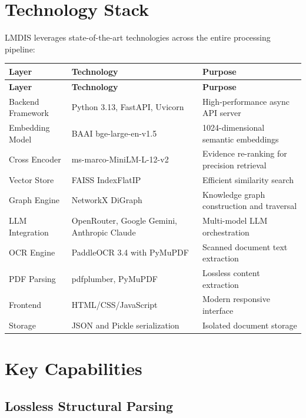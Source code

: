 \documentclass[11pt,a4paper]{article}
\begin{document}
\clearpage
\section{Technology Stack}

LMDIS leverages state-of-the-art technologies across the entire processing pipeline:

\begin{longtable}{@{}lp{5cm}p{5cm}@{}}
\toprule
\textbf{Layer} & \textbf{Technology} & \textbf{Purpose} \\
\midrule
\endfirsthead

\toprule
\textbf{Layer} & \textbf{Technology} & \textbf{Purpose} \\
\midrule
\endhead

\bottomrule
\endfoot

Backend Framework & Python 3.13, FastAPI, Uvicorn & High-performance async API server \\
Embedding Model & BAAI bge-large-en-v1.5 & 1024-dimensional semantic embeddings \\
Cross Encoder & ms-marco-MiniLM-L-12-v2 & Evidence re-ranking for precision retrieval \\
Vector Store & FAISS IndexFlatIP & Efficient similarity search \\
Graph Engine & NetworkX DiGraph & Knowledge graph construction and traversal \\
LLM Integration & OpenRouter, Google Gemini, Anthropic Claude & Multi-model LLM orchestration \\
OCR Engine & PaddleOCR 3.4 with PyMuPDF & Scanned document text extraction \\
PDF Parsing & pdfplumber, PyMuPDF & Lossless content extraction \\
Frontend & HTML/CSS/JavaScript & Modern responsive interface \\
Storage & JSON and Pickle serialization & Isolated document storage \\

\end{longtable}

\clearpage
\section{Key Capabilities}

\subsection{Lossless Structural Parsing}
\end{document}
